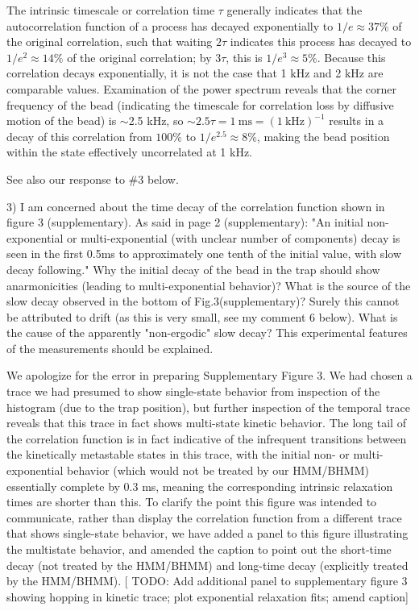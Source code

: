 \documentclass[ucb,qb3,10pt,fullfrom]{ucletter}
\begin{document}
\begin{letter}{}
The intrinsic timescale or correlation time $\tau$ generally indicates that the autocorrelation function of a process has decayed exponentially to $1/e \approx 37\%$ of the original correlation, such that waiting $2\tau$ indicates this process has decayed to $1/e^2 \approx 14\%$ of the original correlation; by $3 \tau$, this is $1/e^3 \approx 5\%$.
Because this correlation decays exponentially, it is not the case that 1 kHz and 2 kHz are comparable values.
Examination of the power spectrum reveals that the corner frequency of the bead (indicating the timescale for correlation loss by diffusive motion of the bead) is $\sim$2.5 kHz, so $\sim 2.5 \tau = 1~\mathrm{ms} = (1~\mathrm{kHz})^{-1}$ results in a decay of this correlation from $100\%$ to $1/e^{2.5} \approx 8\%$, making the bead position within the state effectively uncorrelated at 1 kHz.

See also our response to \#3 below.

\color{red}
3) I am concerned about the time decay of the correlation function shown in figure 3 (supplementary). As said in page 2 (supplementary): "An initial non-exponential or multi-exponential (with unclear number of components) decay is seen in the first 0.5ms to approximately one tenth of the initial value, with slow decay following." Why the initial decay of the bead in the trap should show anarmonicities (leading to multi-exponential behavior)? What is the source of the slow decay observed in the bottom of Fig.3(supplementary)? Surely this cannot be attributed to drift (as this is very small, see my comment 6 below). What is the cause of the apparently "non-ergodic" slow decay? This experimental features of the measurements should be explained.
\color{black}

We apologize for the error in preparing Supplementary Figure 3.
We had chosen a trace we had presumed to show single-state behavior from inspection of the histogram (due to the trap position), but further inspection of the temporal trace reveals that this trace in fact shows multi-state kinetic behavior.
The long tail of the correlation function is in fact indicative of the infrequent transitions between the kinetically metastable states in this trace, with the initial non- or multi-exponential behavior (which would not be treated by our HMM/BHMM) essentially complete by 0.3 ms, meaning the corresponding intrinsic relaxation times are shorter than this.
To clarify the point this figure was intended to communicate, rather than display the correlation function from a different trace that shows single-state behavior, we have added a panel to this figure illustrating the multistate behavior, and amended the caption to point out the short-time decay (not treated by the HMM/BHMM) and long-time decay (explicitly treated by the HMM/BHMM). 
{[\color{blue} TODO: Add additional panel to supplementary figure 3 showing hopping in kinetic trace; plot exponential relaxation fits; amend caption]}


\end{letter}
\end{document}
